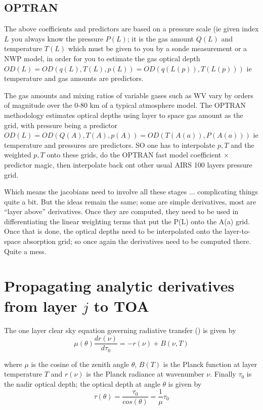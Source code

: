 \documentclass[11pt]{article}
\begin{document}
\subsection{OPTRAN}

The above coefficients and predictors are based on a pressure scale
(ie given index $L$ you always know the pressure $P(L)$; it is the gas
amount $Q(L)$ and temperature $T(L)$ which must be given to you by \eg
a sonde measurement or a NWP model, in order for you to estimate the
gas optical depth $OD(L) = OD(q(L),T(L),p(L)) = OD(q(L(p)),T(L(p)))$
ie temperature and gas amounts are predictors.

The gas amounts and mixing ratios of variable gases such as WV vary by
orders of magnitude over the 0-80 km of a typical atmosphere
model. The OPTRAN \citep{mcm:95*1} methodology estimates optical
depths using layer to space gas amount as the grid, with pressure
being a predictor $OD(L) = OD(Q(A),T(A),p(A)) = OD(T(A(a)),P(A(a)))$
ie temperature and pressures are predictors. SO one has to interpolate
$p,T$ and the weighted $p,T$ onto these grids, do the OPTRAN fast
model coefficient $\times$ predictor magic, then interpolate back ont
other usual AIRS 100 layers pressure grid.

Which means the jacobians need to involve all these stages
... complicating things quite a bit.  But the ideas remain the same;
some are simple derivatives, most are ``layer above''
derivatives. Once they are computed, they need to be used in
differentiating the linear weighting terms that put the P(L) onto the
A(a) grid.  Once that is done, the optical depths need to be
interpolated onto the layer-to-space absorption grid; so once again
the derivatives need to be computed there. Quite a mess.

\section{Propagating analytic derivatives from layer $j$ to TOA}

The one layer clear sky equation governing radiative transfer (\citep{mac:19,goo:89,lio:80}) is given by 
\begin{equation}
\mu(\theta) \frac{d r(\nu)}{d \tau_0} = -r(\nu) + B(\nu,T)
\label{eqn:eqn1}
\end{equation}

where $\mu$ is the cosine of the zenith angle $\theta$, $B(T)$ is the
Planck function at layer temperature $T$ and $r(\nu)$ is the Planck
radiance at wavenumber $\nu$. Finally $\tau_0$ is the nadir optical
depth; the optical depth at angle $\theta$ is given by
\begin{equation}
\tau(\theta) = \frac{\tau_0}{cos(\theta)} = \frac{1}{\mu} \tau_0 
\label{eqn:eqn2}
\end{equation}
\end{document}
